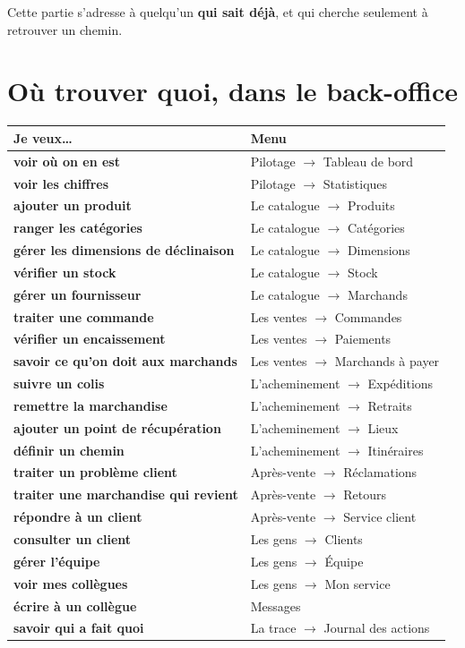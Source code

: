 \documentclass[11pt,a4paper]{report}
\begin{document}
Cette partie s'adresse à quelqu'un \textbf{qui sait déjà}, et qui cherche
seulement à retrouver un chemin.

\section{Où trouver quoi, dans le back-office}

\begin{longtable}{@{}>{\bfseries}p{5.6cm} p{9.2cm}@{}}
\toprule
Je veux\dots & Menu \\
\midrule
\endhead
voir où on en est & Pilotage $\rightarrow$ Tableau de bord \\
voir les chiffres & Pilotage $\rightarrow$ Statistiques \\
ajouter un produit & Le catalogue $\rightarrow$ Produits \\
ranger les catégories & Le catalogue $\rightarrow$ Catégories \\
gérer les dimensions de déclinaison & Le catalogue $\rightarrow$ Dimensions \\
vérifier un stock & Le catalogue $\rightarrow$ Stock \\
gérer un fournisseur & Le catalogue $\rightarrow$ Marchands \\
traiter une commande & Les ventes $\rightarrow$ Commandes \\
vérifier un encaissement & Les ventes $\rightarrow$ Paiements \\
savoir ce qu'on doit aux marchands & Les ventes $\rightarrow$ Marchands à payer \\
suivre un colis & L'acheminement $\rightarrow$ Expéditions \\
remettre la marchandise & L'acheminement $\rightarrow$ Retraits \\
ajouter un point de récupération & L'acheminement $\rightarrow$ Lieux \\
définir un chemin & L'acheminement $\rightarrow$ Itinéraires \\
traiter un problème client & Après-vente $\rightarrow$ Réclamations \\
traiter une marchandise qui revient & Après-vente $\rightarrow$ Retours \\
répondre à un client & Après-vente $\rightarrow$ Service client \\
consulter un client & Les gens $\rightarrow$ Clients \\
gérer l'équipe & Les gens $\rightarrow$ Équipe \\
voir mes collègues & Les gens $\rightarrow$ Mon service \\
écrire à un collègue & Messages \\
savoir qui a fait quoi & La trace $\rightarrow$ Journal des actions \\
\bottomrule
\end{longtable}
\end{document}

